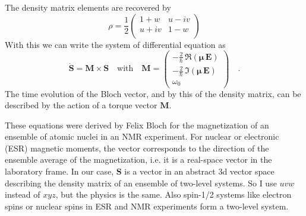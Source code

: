 The density matrix elements are recovered by
\begin{equation}
 \rho = \frac{1}{2} 
 \begin{pmatrix}
 1+ w & u - i v \\ u + i v & 1 - w\\
 \end{pmatrix}
\end{equation}
With this we can write the system of differential equation as 
\begin{equation}
 \dot{\boldsymbol{S}} = \boldsymbol{M}   \times \boldsymbol{S} 
 \quad \text{with} \quad 
 \boldsymbol{M}  = 
 \begin{pmatrix}
 -\frac{2}{\hbar} \, \Re ( \boldsymbol{\mu} \, \boldsymbol{E} ) \\
 - \frac{2}{\hbar} \, \Im ( \boldsymbol{\mu} \, \boldsymbol{E} ) \\
  \omega_0
 \end{pmatrix} \quad .
\end{equation}
The time evolution of the Bloch vector, and by this of the density matrix, can be described by the action of a torque vector $\boldsymbol{M}$. 


These equations were derived by Felix Bloch for the magnetization of an ensemble of atomic nuclei in an NMR experiment. For nuclear or electronic (ESR) magnetic moments, the vector corresponds to the direction of the ensemble average of the magnetization, i.e. it is a real-space vector in the laboratory frame. In our case, $\mathbf{S}$ is a vector in an abstract 3d vector space describing the density matrix of an ensemble of two-level systems. So I use $uvw$ instead of $xyz$, but the physics is the same. Also spin-1/2 systems like electron spins or nuclear spins in ESR and NMR experiments form a two-level system.


